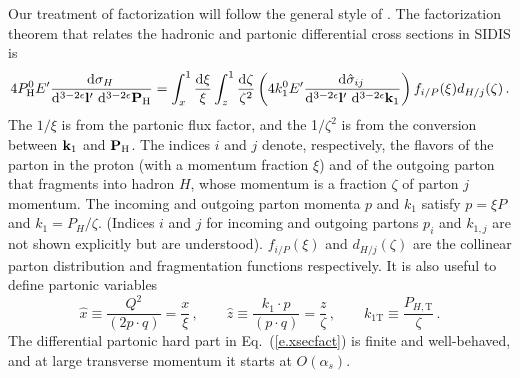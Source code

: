 \documentclass[prd,preprintnumbers,nofootinbib,superscriptaddress,onecolumn,preprint]{revtex4-1}
\newcommand\3[1]{\boldsymbol{#1}}
\newcommand{\Tsc}[2]{#1_{#2\text{T}}}
\newcommand{\parz}[1]{\ensuremath{\left(#1\right)}}
\newcommand{\order}[1]{\ensuremath{O\parz{#1}}}
\newcommand{\eref}[1]{Eq.~(\ref{e.#1})}
\begin{document}
Our treatment of factorization will follow the general style of \cite{Collins:2011qcdbook}.  
The factorization theorem that relates the hadronic and partonic differential cross
sections in SIDIS is
%
\begin{equation}
4 P_{\rm H}^0 E^\prime 
 \frac{\diff{\sigma_H}{}}
      {\diff{^{3- 2 \epsilon} {\bf l}{'}} \, \diff{^{3- 2 \epsilon} {\bf P}_{\rm H} }} 
=
  \int_{x}^{1} \frac{\diff{\xi}}{\xi} 
  \int_{z}^{1} \frac{\diff{\zeta}}{\zeta^2} 
  \left( 4 k_1^0 E^\prime 
        \frac{\diff{\hat{\sigma}_{ij}}{}}
             {\diff{^{3-2\epsilon} {\bf l}{'}} \, \diff{^{3-2\epsilon} {\bf k}_1 }} 
   \right) 
   f_{i/P}(\xi) d_{H/j}(\zeta) \, . 
\label{e.xsecfact}
\end{equation}
%
The $1/\xi$ is from the partonic flux factor, and the 1$/\zeta^2$ is
from the conversion between ${\bf k}_1$ and ${\bf P}_{\rm H}$.  The
indices $i$ and $j$ denote, respectively, the flavors of the parton in
the proton (with a momentum fraction $\xi$) and of the outgoing parton that
fragments into hadron $H$, whose momentum is a fraction $\zeta$ of
parton $j$ momentum. The incoming and outgoing parton momenta $p$ and
$k_1$ satisfy $p=\xi P$ and $k_1=P_H/\zeta$. (Indices $i$ and $j$ for
incoming and outgoing partons $p_i$ and $k_{1,j}$ are not shown
explicitly but are understood).  $f_{i/P}(\xi)$ and $d_{H/j}(\zeta)$
are the collinear parton distribution and fragmentation functions
respectively. It is also useful to define partonic variables 
%
\begin{equation}
\hat{x}\equiv \frac{Q^2}{(2p\cdot q)} = \frac{x}{\xi} \, , \qquad \hat{z} \equiv \frac{k_1\cdot p}{(p\cdot q)} = \frac{z}{\zeta} \, , \qquad  \Tsc{k}{1}\equiv \frac{\Tsc{P}{H,}}{\zeta} \, .
\end{equation}
%
The differential partonic hard part in \eref{xsecfact} is finite and
well-behaved, and at large transverse momentum it starts at
$\order{\alpha_s}$. 
\end{document}
